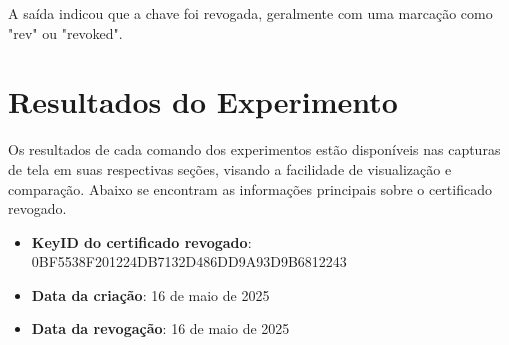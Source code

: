 A saída indicou que a chave foi revogada, geralmente com uma marcação como "rev" ou "revoked".

\section{Resultados do Experimento}

Os resultados de cada comando dos experimentos estão disponíveis nas capturas de tela em suas respectivas seções, visando a facilidade de visualização e comparação. Abaixo se encontram as informações principais sobre o certificado revogado.

\begin{itemize}
    \item \textbf{KeyID do certificado revogado}: 0BF5538F201224DB7132D486DD9A93D9B6812243
    \item \textbf{Data da criação}: 16 de maio de 2025
    \item \textbf{Data da revogação}: 16 de maio de 2025
\end{itemize} 